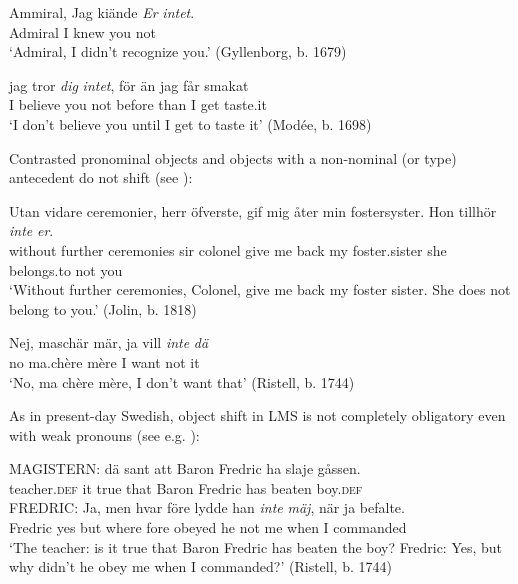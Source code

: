 \documentclass[output=paper]{langscibook}
\begin{document}
\ea\label{ex:intro:17}
\ea\label{ex:intro:17a}
\gll  Ammiral, Jag   kiände \textit{Er} \textit{intet}.\\
    Admiral   I       knew   you       not\\
    \glt ‘Admiral, I didn’t recognize you.’ (Gyllenborg, b. 1679)


\ex\label{ex:intro:17b}
\gll  jag tror \textit{dig} \textit{intet},   för     än   jag   får smakat \\
    I     believe you     not     before   than   I     get taste.it\\
    \glt ‘I don’t believe you until I get to taste it’ (Modée, b. 1698)
\z
\z


Contrasted pronominal objects and objects with a non-nominal (or type) antecedent do not shift (see \citealt{Andreasson2008}):


\ea\label{ex:intro:18}
\ea\label{ex:intro:18a}
\gll  Utan     vidare ceremonier,   herr   öfverste,   gif   mig   åter min fostersyster. Hon   tillhör \textit{inte} \textit{er}.\\
without   further ceremonies   sir   colonel     give me   back my foster.sister she   belongs.to   not   you\\
\glt ‘Without further ceremonies, Colonel, give me back my foster sister. She does not belong to you.’ (Jolin, b. 1818)


\ex\label{ex:intro:18b}
\gll  Nej, maschär   mär,   ja vill \textit{inte} \textit{dä}\\
      no    ma.chère   mère  I  want  not   it\\
 \glt       ‘No, ma chère   mère, I don’t want that’ (Ristell, b. 1744)
\z
\z


As in present-day Swedish, object shift in LMS is not completely obligatory even with weak pronouns (see e.g. \citealt{Erteschik-ShirJosefsson2017}): 

\ea
\gll  MAGISTERN: dä     sant     att  Baron  Fredric  ha  slaje    gåssen. \\
  teacher\textsc{.def}  it  true   that  Baron  Fredric  has  beaten  boy.\textsc{def}\\

\gll  FREDRIC: Ja, men   hvar    före   lydde    han \textit{inte} \textit{mäj}, när      ja   befalte.\\
 Fredric    yes but   where  fore    obeyed   he    not  me   when    I   commanded\\
 
\glt ‘The teacher: is it true that Baron Fredric has beaten the boy? Fredric: Yes, but why didn’t he obey me when I commanded?’ (Ristell, b. 1744)
\z
\end{document}
